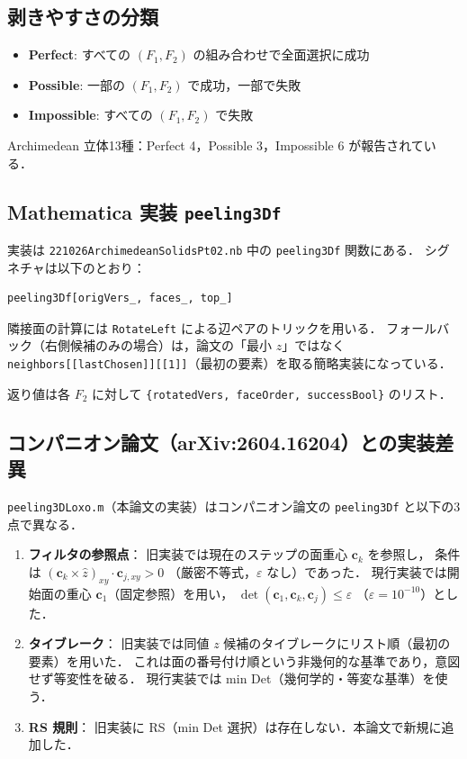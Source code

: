 \documentclass[12pt,a4paper]{article}
\theoremstyle{definition}
\begin{document}
\subsection{剥きやすさの分類}

\begin{itemize}
  \item \textbf{Perfect}: すべての $(F_1, F_2)$ の組み合わせで全面選択に成功
  \item \textbf{Possible}: 一部の $(F_1, F_2)$ で成功，一部で失敗
  \item \textbf{Impossible}: すべての $(F_1, F_2)$ で失敗
\end{itemize}

\noindent Archimedean 立体13種：Perfect 4，Possible 3，Impossible 6 が報告されている．

\subsection{Mathematica 実装 \texttt{peeling3Df}}

実装は \texttt{221026ArchimedeanSolidsPt02.nb} 中の \texttt{peeling3Df} 関数にある．
シグネチャは以下のとおり：

\begin{lstlisting}
peeling3Df[origVers_, faces_, top_]
\end{lstlisting}

\noindent 隣接面の計算には \texttt{RotateLeft} による辺ペアのトリックを用いる．
フォールバック（右側候補のみの場合）は，論文の「最小 $z$」ではなく
\texttt{neighbors[[lastChosen]][[1]]}（最初の要素）を取る簡略実装になっている．

返り値は各 $F_2$ に対して \texttt{\{rotatedVers, faceOrder, successBool\}} のリスト．


\subsection{コンパニオン論文（arXiv:2604.16204）との実装差異}

\texttt{peeling3DLoxo.m}（本論文の実装）はコンパニオン論文の \texttt{peeling3Df}
と以下の3点で異なる．

\begin{enumerate}
\item \textbf{フィルタの参照点}：
  旧実装では現在のステップの面重心 $\mathbf{c}_k$ を参照し，
  条件は $(\mathbf{c}_k \times \hat{z})_{xy}\cdot\mathbf{c}_{j,xy}>0$
  （厳密不等式，$\varepsilon$ なし）であった．
  現行実装では開始面の重心 $\mathbf{c}_1$（固定参照）を用い，
  $\det(\mathbf{c}_1,\mathbf{c}_k,\mathbf{c}_j)\le\varepsilon$
  （$\varepsilon=10^{-10}$）とした．

\item \textbf{タイブレーク}：
  旧実装では同値 $z$ 候補のタイブレークにリスト順（最初の要素）を用いた．
  これは面の番号付け順という非幾何的な基準であり，意図せず等変性を破る．
  現行実装では min Det（幾何学的・等変な基準）を使う．

\item \textbf{RS 規則}：
  旧実装に RS（min Det 選択）は存在しない．本論文で新規に追加した．
\end{enumerate}
\end{document}
